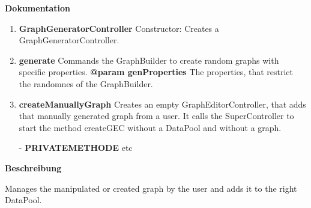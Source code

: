 \textbf{Dokumentation}
\begin{enumerate}[+]
	\item{
	\textbf{GraphGeneratorController} \newline
	Constructor: Creates a GraphGeneratorController. \newline
}
	\item{
	\textbf{generate} \newline
	Commands the GraphBuilder to create random graphs with specific properties. \newline
	\textbf{@param genProperties} The properties, that restrict the randomnes of the GraphBuilder.\newline

}

	\item{
	\textbf{createManuallyGraph} \newline
	Creates an empty GraphEditorController, that adds that manually generated graph from a user.\newline
	It calls the SuperController to start the method createGEC without a DataPool and without a graph.\newline

}
	\item[-]{
		\textbf{PRIVATEMETHODE} etc
	}
\end{enumerate}

\textbf{Beschreibung}

Manages the manipulated or created graph by the user and adds it to the right DataPool. \newline

